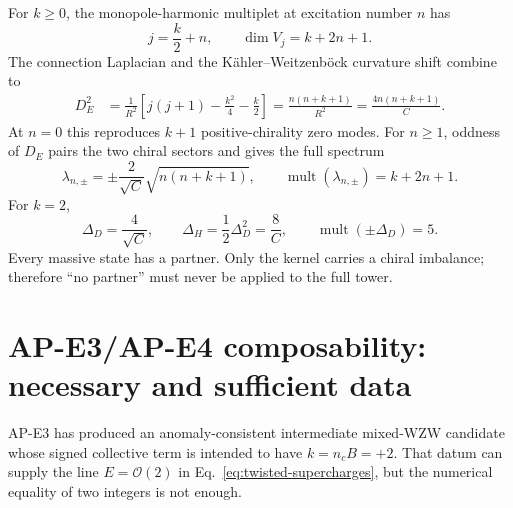 \documentclass[11pt]{article}
\theoremstyle{definition}
\theoremstyle{remark}
\newcommand{\cO}{\mathcal O}
\begin{document}
For \(k\ge0\), the monopole-harmonic multiplet at excitation number \(n\)
has
\begin{equation}
 j=\frac{k}{2}+n,\qquad \dim V_j=k+2n+1.
 \label{eq:j}
\end{equation}
The connection Laplacian and the K\"ahler--Weitzenb\"ock curvature shift
combine to
\begin{align}
 D_E^2
 &=\frac1{R^2}\left[j(j+1)-\frac{k^2}{4}-\frac{k}{2}\right]
 =\frac{n(n+k+1)}{R^2}
 =\frac{4n(n+k+1)}{C}.
 \label{eq:spectrum-square}
\end{align}
At \(n=0\) this reproduces \(k+1\) positive-chirality zero modes.  For
\(n\ge1\), oddness of \(D_E\) pairs the two chiral sectors and gives the
full spectrum~\cite{BykovSmilga2023APE4SQM}
\begin{equation}
 \boxed{\lambda_{n,\pm}=\pm\frac{2}{\sqrt C}
 \sqrt{n(n+k+1)},\qquad
 \operatorname{mult}(\lambda_{n,\pm})=k+2n+1.}
 \label{eq:full-spectrum}
\end{equation}
For \(k=2\),
\begin{equation}
 \Delta_D=\frac4{\sqrt C},\qquad
 \Delta_H=\frac12\Delta_D^2=\frac8C,
 \qquad \operatorname{mult}(\pm\Delta_D)=5.
 \label{eq:gaps}
\end{equation}
Every massive state has a partner.  Only the kernel carries a chiral
imbalance; therefore ``no partner'' must never be applied to the full tower.

\section{AP-E3/AP-E4 composability: necessary and sufficient data}

AP-E3 has produced an anomaly-consistent intermediate mixed-WZW candidate
whose signed collective term is intended to have \(k=n_cB=+2\).  That datum
can supply the line \(E=\cO(2)\) in Eq.~\eqref{eq:twisted-supercharges}, but
the numerical equality of two integers is not enough.
\end{document}
